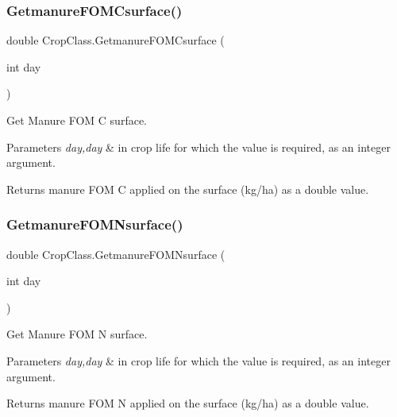 \subsubsection{\texorpdfstring{GetmanureFOMCsurface()}{GetmanureFOMCsurface()}}
{\footnotesize\ttfamily double Crop\+Class.\+Getmanure\+F\+O\+M\+Csurface (\begin{DoxyParamCaption}\item[{int}]{day }\end{DoxyParamCaption})\hspace{0.3cm}{\ttfamily [inline]}}



Get Manure F\+OM C surface. 


\begin{DoxyParams}{Parameters}
{\em day,day} & in crop life for which the value is required, as an integer argument. \\
\hline
\end{DoxyParams}
\begin{DoxyReturn}{Returns}
manure F\+OM C applied on the surface (kg/ha) as a double value. 
\end{DoxyReturn}
\mbox{\label{class_crop_class_ae26a1b93ce62ef13eaa40c463fa24c92}} 
\subsubsection{\texorpdfstring{GetmanureFOMNsurface()}{GetmanureFOMNsurface()}}
{\footnotesize\ttfamily double Crop\+Class.\+Getmanure\+F\+O\+M\+Nsurface (\begin{DoxyParamCaption}\item[{int}]{day }\end{DoxyParamCaption})\hspace{0.3cm}{\ttfamily [inline]}}



Get Manure F\+OM N surface. 


\begin{DoxyParams}{Parameters}
{\em day,day} & in crop life for which the value is required, as an integer argument. \\
\hline
\end{DoxyParams}
\begin{DoxyReturn}{Returns}
manure F\+OM N applied on the surface (kg/ha) as a double value. 
\end{DoxyReturn}
\mbox{\label{class_crop_class_ac2d29d7d8d81c021821ae92b038787b1}} 
